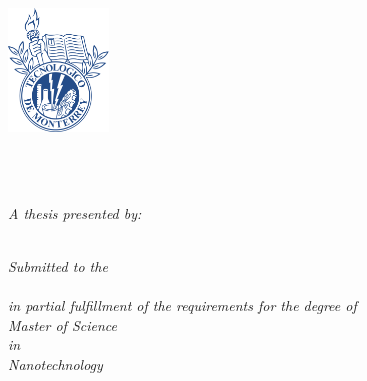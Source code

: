 \documentclass[
11pt, 
oneside,
english,
onehalfspacing,
onehalfspacing,
parskip,
headsepline,
]{MastersDoctoralThesis}
\author{Antonio Osamu Katagiri Tanaka}
\begin{document}
\frontmatter

\pagestyle{plain} 


\begin{titlepage}
\begin{center}

\vspace*{.06\textheight}
{\scshape\LARGE \univname\par} %

\campusname\\\deptname\\[1cm]

\begin{center}
\includegraphics[width=0.20\textwidth]{./Figures/uniLogo.png}
\end{center}

\vspace{0.5cm}

\HRule \\%
{\huge \bfseries \ttitle\par}\vspace{0.0cm} %
\HRule \\[0.5cm]                            %
 
\emph{A thesis presented by:}\\

\href{https://linkedin.com/in/osamu-katagiri-84b2b940/}{\authorname}
\\[0.5cm]
 
\vfill

\large \textit{Submitted to the\\
\deptname\\
in partial fulfillment of the requirements for the degree of}\\[0.25cm]
\textit{Master of Science}\\[0.25cm]
\textit{in}\\[0.25cm]
\textit{Nanotechnology}
 

\end{center}
\end{titlepage}
\end{document}
